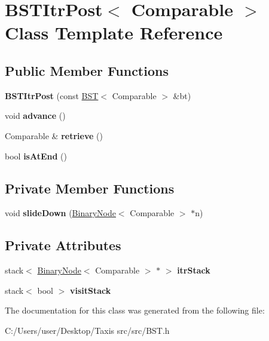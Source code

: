 \hypertarget{class_b_s_t_itr_post}{}\section{B\+S\+T\+Itr\+Post$<$ Comparable $>$ Class Template Reference}
\label{class_b_s_t_itr_post}
\subsection*{Public Member Functions}
\begin{DoxyCompactItemize}
\item 
\mbox{\label{class_b_s_t_itr_post_acf7e537dea01978f40c40909c55c56c2}} 
{\bfseries B\+S\+T\+Itr\+Post} (const \hyperlink{class_b_s_t}{B\+ST}$<$ Comparable $>$ \&bt)
\item 
\mbox{\label{class_b_s_t_itr_post_a376098e5a82cd02118dd4dcdec49bb26}} 
void {\bfseries advance} ()
\item 
\mbox{\label{class_b_s_t_itr_post_a72446e4d0df0bcafc14294a78faeb56e}} 
Comparable \& {\bfseries retrieve} ()
\item 
\mbox{\label{class_b_s_t_itr_post_a2f330e73bb817e8bd1c797805e66ddb7}} 
bool {\bfseries is\+At\+End} ()
\end{DoxyCompactItemize}
\subsection*{Private Member Functions}
\begin{DoxyCompactItemize}
\item 
\mbox{\label{class_b_s_t_itr_post_a56a13ae3a0358eeb06a83d4de745344a}} 
void {\bfseries slide\+Down} (\hyperlink{class_binary_node}{Binary\+Node}$<$ Comparable $>$ $\ast$n)
\end{DoxyCompactItemize}
\subsection*{Private Attributes}
\begin{DoxyCompactItemize}
\item 
\mbox{\label{class_b_s_t_itr_post_add32204909b8a6c3635b926832192ced}} 
stack$<$ \hyperlink{class_binary_node}{Binary\+Node}$<$ Comparable $>$ $\ast$ $>$ {\bfseries itr\+Stack}
\item 
\mbox{\label{class_b_s_t_itr_post_a5a9af907c7b135acdf3b5ed9affbb9a7}} 
stack$<$ bool $>$ {\bfseries visit\+Stack}
\end{DoxyCompactItemize}


The documentation for this class was generated from the following file\+:\begin{DoxyCompactItemize}
\item 
C\+:/\+Users/user/\+Desktop/\+Taxis src/src/B\+S\+T.\+h\end{DoxyCompactItemize}
